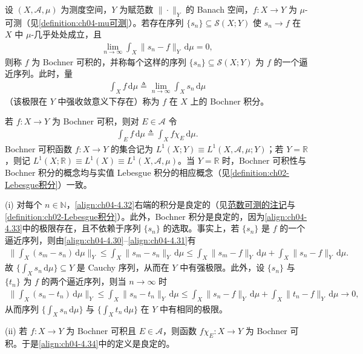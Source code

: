 \documentclass[../../main.tex]{subfiles}%
\begin{document}
\begin{definition}\label{definition:ch04-Bochner可积}
设 $(X,\mathcal{A},\mu)$ 为测度空间，$Y$ 为赋范数 $\|\cdot\|_Y$ 的 Banach 空间，$f:X\to Y$ 为 $\mu$-可测（见\cref{definition:ch04-mu可测}）。若存在序列 $\{s_n\}\subseteq\mathcal{S}(X;Y)$ 使 $s_n\to f$ 在 $X$ 中 $\mu$-几乎处处成立，且
\begin{align}
\lim_{n\to\infty}\int_X\|s_n-f\|_Y\,\mathrm{d}\mu=0, \label{align:ch04-4.32}
\end{align}
则称 $f$ 为 Bochner 可积的，并称每个这样的序列 $\{s_n\}\subseteq\mathcal{S}(X;Y)$ 为 $f$ 的一个逼近序列。此时，量
\begin{align}
\int_X f\,\mathrm{d}\mu\triangleq \lim_{n\to\infty}\int_X s_n\,\mathrm{d}\mu \label{align:ch04-4.33}
\end{align}
（该极限在 $Y$ 中强收敛意义下存在）称为 $f$ 在 $X$ 上的 Bochner 积分。
\end{definition}

若 $f:X\to Y$ 为 Bochner 可积，则对 $E\in\mathcal{A}$ 令
\begin{align}
\int_E f\,\mathrm{d}\mu\triangleq \int_X f\chi_E\,\mathrm{d}\mu. \label{align:ch04-4.34}
\end{align}
Bochner 可积函数 $f:X\to Y$ 的集合记为 $L^1(X;Y)\equiv L^1(X,\mathcal{A},\mu;Y)$；若 $Y=\mathbb{R}$，则记 $L^1(X;\mathbb{R})\equiv L^1(X)\equiv L^1(X,\mathcal{A},\mu)$。当 $Y=\mathbb{R}$ 时，Bochner 可积性与 Bochner 积分的概念均与实值 Lebesgue 积分的相应概念（见\cref{definition:ch02-Lebesgue积分}）一致。

\begin{remark}\label{remark:ch04-Bochner良定义}
(i) 对每个 $n\in\mathbb{N}$，\eqref{align:ch04-4.32}右端的积分是良定的（见\hyperref[remark:ch04-范数可测]{范数可测的注记}与\cref{definition:ch02-Lebesgue积分}）。此外，Bochner 积分是良定的，因为\eqref{align:ch04-4.33}中的极限存在，且不依赖于序列 $\{s_n\}$ 的选取。事实上，若 $\{s_n\}$ 是 $f$ 的一个逼近序列，则由\eqref{align:ch04-4.30}--\eqref{align:ch04-4.31}有
\begin{align*}
\Big\|\int_X(s_m-s_n)\,\mathrm{d}\mu\Big\|_Y\leqslant\int_X\|s_m-s_n\|_Y\,\mathrm{d}\mu\leqslant\int_X\|s_m-f\|_Y\,\mathrm{d}\mu+\int_X\|s_n-f\|_Y\,\mathrm{d}\mu.
\end{align*}
故 $\{\int_X s_n\,\mathrm{d}\mu\}\subseteq Y$ 是 Cauchy 序列，从而在 $Y$ 中有强极限。此外，设 $\{s_n\}$ 与 $\{t_n\}$ 为 $f$ 的两个逼近序列，则当 $n\to\infty$ 时
\begin{align*}
\Big\|\int_X(s_n-t_n)\,\mathrm{d}\mu\Big\|_Y\leqslant\int_X\|s_n-t_n\|_Y\,\mathrm{d}\mu\leqslant\int_X\|s_n-f\|_Y\,\mathrm{d}\mu+\int_X\|t_n-f\|_Y\,\mathrm{d}\mu\to0,
\end{align*}
从而序列 $\{\int_X s_n\,\mathrm{d}\mu\}$ 与 $\{\int_X t_n\,\mathrm{d}\mu\}$ 在 $Y$ 中有相同的极限。

(ii) 若 $f:X\to Y$ 为 Bochner 可积且 $E\in\mathcal{A}$，则函数 $f\chi_E:X\to Y$ 为 Bochner 可积。于是\eqref{align:ch04-4.34}中的定义是良定的。
\end{remark}
\end{document}
